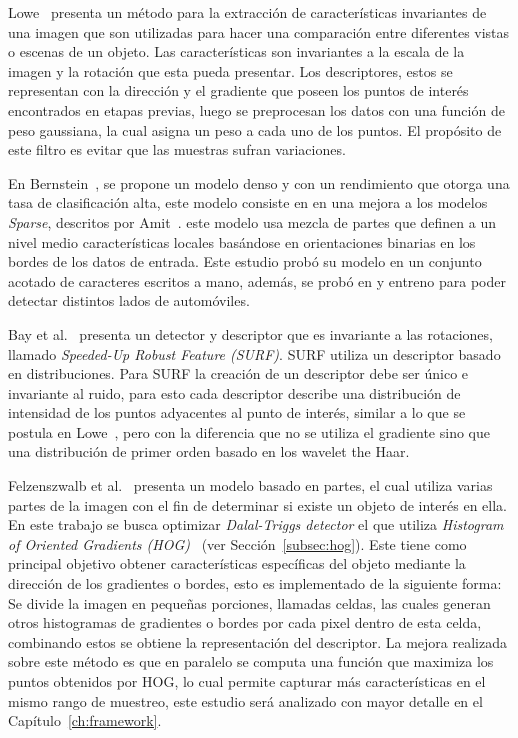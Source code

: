 Lowe~\cite{sift2004} presenta un método para la extracción de características invariantes de una imagen que son utilizadas para hacer una comparación entre diferentes vistas o escenas de un objeto. Las características son invariantes a la escala de la imagen y la rotación que esta pueda presentar. Los descriptores, estos se representan con la dirección y el gradiente que poseen los puntos de interés encontrados en etapas previas, luego se preprocesan los datos con una función de peso gaussiana, la cual asigna un peso a cada uno de los puntos. El propósito de este filtro es evitar que las muestras sufran variaciones.

En Bernstein~\cite{statistical2005}, se propone un modelo denso y con un rendimiento que otorga una tasa de clasificación alta, este modelo consiste en en una mejora a los modelos \textit{Sparse}, descritos por Amit~\cite{Amit2002}. este modelo usa mezcla de partes que definen a un nivel medio características locales basándose en orientaciones binarias en los bordes de los datos de entrada. Este estudio probó su modelo en un conjunto acotado de caracteres escritos a mano, además, se probó en y entreno para poder detectar distintos lados de automóviles.

Bay et al.~\cite{surf2008} presenta un detector y descriptor que es invariante a las rotaciones, llamado \textit{Speeded-Up Robust Feature (SURF)}. SURF utiliza un descriptor basado en distribuciones. Para SURF la creación de un descriptor debe ser único e invariante al ruido, para esto cada descriptor describe una distribución de intensidad de los puntos adyacentes al punto de interés, similar a lo que se postula en Lowe~\cite{sift2004}, pero con la diferencia que no se utiliza el gradiente sino que una distribución de primer orden basado en los wavelet the Haar.

Felzenszwalb et al.~\cite{Felzenszwalb2010} presenta un modelo basado en partes,  el cual utiliza varias partes de la imagen con el fin de determinar si existe un objeto de interés en ella. En este trabajo se busca optimizar \textit{Dalal-Triggs detector} el que utiliza \textit{Histogram of Oriented Gradients (HOG)}~\cite{hog2005} (ver Sección~\ref{subsec:hog}). Este tiene como principal objetivo obtener características específicas del objeto mediante la dirección de los gradientes o bordes, esto es implementado de la siguiente forma: Se divide la imagen en pequeñas porciones, llamadas celdas, las cuales generan otros histogramas de gradientes o bordes por cada pixel dentro de esta celda, combinando estos se obtiene la representación del descriptor. La mejora realizada sobre este método es que en paralelo se computa una función que maximiza los puntos obtenidos por HOG, lo cual permite capturar más características en el mismo rango de muestreo, este estudio será analizado con mayor detalle en el Capítulo~\ref{ch:framework}.

